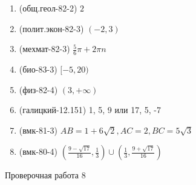 \documentclass[11pt,a5paper]{report}
\begin{document}
\begin{enumerate}

\item (общ.геол-82-2) $2$

\item (полит.экон-82-3) $(-2, 3)$

\item (мехмат-82-3) $\frac{5}{6}\pi+2\pi n$

\item (био-83-3) $[-5, 20)$

\item (физ-82-4) $(3, +\infty)$

\item (галицкий-12.151) 1, 5, 9 или 17, 5, -7

\item (вмк-81-3) $AB=1+6\sqrt{2}, AC=2, BC=5\sqrt{3}$

\item (вмк-80-4) $(\frac{9-\sqrt{17}}{16}, \frac{1}{3}) \cup (\frac{1}{3}, \frac{9+\sqrt{17}}{16})$

\end{enumerate}

\newpage

\begin{center}
Проверочная работа 8


\end{center}
\end{document}
